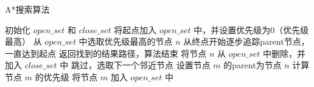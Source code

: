 \documentclass{article}
\begin{document}
\begin{algorithm}
\caption{A*搜索算法}
\begin{algorithmic}
\State 初始化 $open\_set$ 和 $close\_set$
\State 将起点加入 $open\_set$ 中，并设置优先级为0（优先级最高）
    \State 从 $open\_set$ 中选取优先级最高的节点 $n$
        \State 从终点开始逐步追踪parent节点，一直达到起点
        \State 返回找到的结果路径，算法结束
    \Else
        \State 将节点 $n$ 从 $open\_set$ 中删除，并加入 $close\_set$ 中
                \State 跳过，选取下一个邻近节点
                \State 设置节点 $m$ 的parent为节点 $n$
                \State 计算节点 $m$ 的优先级
                \State 将节点 $m$ 加入 $open\_set$ 中
            \EndIf
        \EndFor
    \EndIf
\EndWhile
\end{algorithmic}
\end{algorithm}
\end{document}
